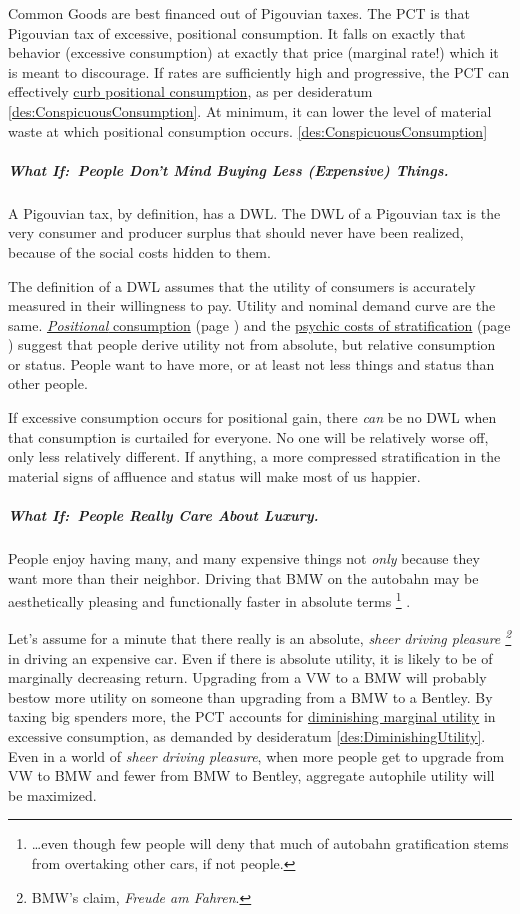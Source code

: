 Common Goods are best financed out of Pigouvian taxes.
The PCT is that Pigouvian tax of excessive, positional consumption.
It falls on exactly that behavior (excessive consumption) at exactly that price (marginal rate!) which it is meant to discourage.
If rates are sufficiently high and progressive, the PCT can effectively \hyperref[des:ConspicuousConsumption]{curb positional consumption}, as per desideratum \ref{des:ConspicuousConsumption}.
At minimum, it can lower the level of material waste at which positional consumption occurs.
\ref{des:ConspicuousConsumption}

\subparagraph{What If:~People Don't Mind Buying Less (Expensive) Things.} A Pigouvian tax, by definition, has a DWL.
The DWL of a Pigouvian tax is the very consumer and producer surplus that should never have been realized, because of the social costs hidden to them.

The definition of a DWL assumes that the utility of consumers is accurately measured in their willingness to pay.
Utility and nominal demand curve are the same.
\hyperref[sec:ConspicuousConsumption]{\emph{Positional} consumption} (page \pageref{sec:ConspicuousConsumption}) and the \hyperref[sec:PsychicCosts]{psychic costs of stratification} (page \pageref{sec:PsychicCosts}) suggest that people derive utility not from absolute, but relative consumption or status.
People want to have more, or at least not less things and status than other people.

If excessive consumption occurs for positional gain, there \emph{can} be no DWL when that consumption is curtailed for everyone.
No one will be relatively worse off, only less relatively different.
If anything, a more compressed stratification in the material signs of affluence and status will make most of us happier.

\subparagraph{What If:~People Really Care About Luxury.} People enjoy having many, and many expensive things not \emph{only} because they want more than their neighbor.
Driving that BMW on the autobahn may be aesthetically pleasing and functionally faster in absolute terms
\footnote{
	\ldots even though few people will deny that much of autobahn gratification stems from overtaking other cars, if not people.
}
.

Let's assume for a minute that there really is an absolute, \emph{sheer driving pleasure
\footnote{
	BMW's claim, \emph{Freude am Fahren}.
}
}
in driving an expensive car.
Even if there is absolute utility, it is likely to be of marginally decreasing return.
Upgrading from a VW to a BMW will probably bestow more utility on someone than upgrading from a BMW to a Bentley.
By taxing big spenders more, the PCT accounts for \hyperref[des:DiminishingUtility]{diminishing marginal utility} in excessive consumption, as demanded by desideratum \ref{des:DiminishingUtility}.
Even in a world of \emph{sheer driving pleasure}, when more people get to upgrade from VW to BMW and fewer from BMW to Bentley, aggregate autophile utility will be maximized.

